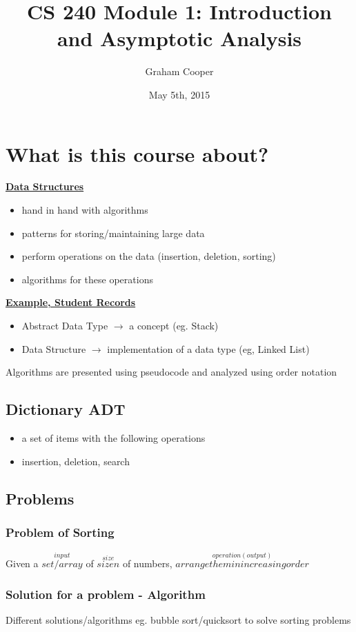 \documentclass[12pt]{article}
\title{\vspace{-15ex}CS 240 Module 1: Introduction and Asymptotic Analysis\vspace{-1ex}}
\date{May 5th, 2015}
\author{Graham Cooper}
\newcommand{\myt}[1]{\textbf{\underline{#1}}}
\begin{document}
	\maketitle
	\section*{What is this course about?}
	\myt{Data Structures}
	\begin{itemize}
		\item hand in hand with algorithms
		\item patterns for storing/maintaining large data
		\item perform operations on the data (insertion, deletion, sorting)
		\item algorithms for these operations
	\end{itemize}
	
	\myt{Example, Student Records}
	\begin{itemize}
		\item Abstract Data Type $\rightarrow$ a concept (eg. Stack)
		\item Data Structure $\rightarrow$ implementation of a data type (eg, Linked List)
	\end{itemize}
	
	Algorithms are presented using pseudocode and analyzed using order notation
	
	\subsection*{Dictionary ADT}
	\begin{itemize}
		\item a set of items with the following operations
		\item insertion, deletion, search
	\end{itemize}	
	
	\subsection*{Problems}
	\subsubsection*{Problem of Sorting}
	Given a $\overset{input}{set/array}$ of $\overset{size}{size n}$ of numbers, 
	$\overset{operation(output)}{arrange them in increasing order}$
	
	\subsubsection*{Solution for a problem - Algorithm}
	Different solutions/algorithms eg. bubble sort/quicksort to solve sorting problems
	
\end{document}
